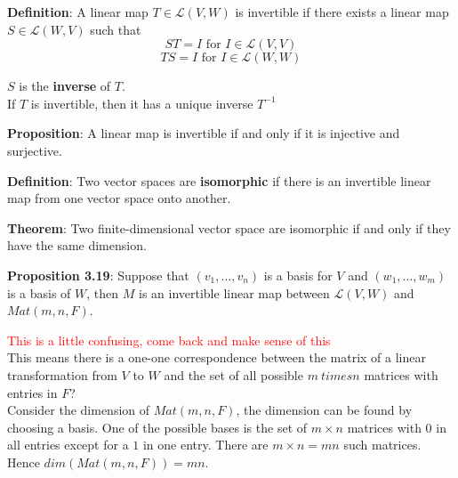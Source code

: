 \documentclass[a4paper, 10pt]{report}
\begin{document}
\begin{framed}
   \textbf{Definition}: A linear map $T \in \mathcal{L}(V, W)$ is invertible if there exists a linear map $S \in \mathcal{L}(W, V)$ such that
   \[
      ST = I \text{ for } I \in \mathcal{L}(V, V)
   \] 
   \[
      TS = I \text{ for } I \in \mathcal{L}(W, W)
   \] 

   $S$ is the \textbf{inverse} of $T$.  \\

   If $T$ is invertible, then it has a unique inverse $T^{-1}$ \\
\end{framed}

\begin{framed}
   \textbf{Proposition}: A linear map is invertible if and only if it is injective and surjective.
\end{framed}

\begin{framed}
   \textbf{Definition}: Two vector spaces are \textbf{isomorphic} if there is an invertible linear map from one vector space onto another. 
\end{framed}

\begin{framed}
   \textbf{Theorem}: Two finite-dimensional vector space are isomorphic if and only if they have the same dimension.
  
\end{framed}

\begin{framed}
   \textbf{Proposition 3.19}: Suppose that $(v_1, \hdots , v_n)$ is a basis for $V$ and $(w_1, \hdots, w_m)$ is a basis of $W$, then $M$ is an invertible linear map between $\mathcal{L}(V, W)$ and $Mat(m, n, F)$.
\end{framed}

\textcolor{red}{This is a little confusing, come back and make sense of this} \\

This means there is a one-one correspondence between the matrix of a linear transformation from $V$ to $W$ and the set of all possible $m\ times n$ matrices with entries in $F$? \\

Consider the dimension of $Mat(m, n, F)$, the dimension can be found by choosing a basis. One of the possible bases is the set of $m \times n$ matrices with 0 in all entries except for a $1$ in one entry. There are $m \times n = mn$ such matrices. Hence $dim(Mat(m, n, F)) = mn$. \\
\end{document}
